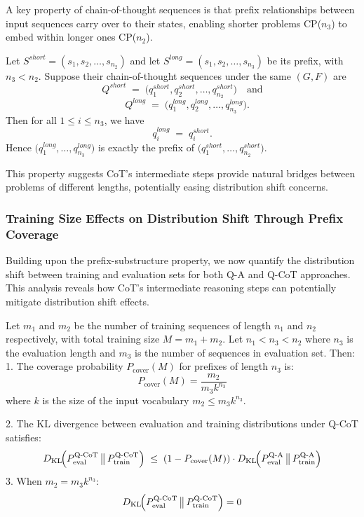 A key property of chain-of-thought sequences is that prefix relationships between input sequences carry over to their states, enabling shorter problems CP($n_3$) to embed within longer ones CP($n_2$).

\begin{lemma}
\label{thm:prefix-substructure}
Let \(S^{short} = (s_1, s_2, \ldots, s_{n_2})\) and let \(S^{long} = (s_1, s_2, \ldots, s_{n_3})\) be its prefix, with \(n_3 < n_2\).  Suppose their chain-of-thought sequences under the same \((G,F)\) are
\[
   Q^{short} \;=\;
   \bigl(q_1^{short}, q_2^{short}, \ldots, q_{n_2}^{short}\bigr)
   \quad\text{and}
\]
\[\quad
   Q^{long} \;=\;
   \bigl(q_1^{long}, q_2^{long}, \ldots, q_{n_3}^{long}\bigr).
\]
Then for all \(1 \le i \le n_3\), we have
\[
   q_i^{long} 
   \;=\; 
   q_i^{short}.
\]
Hence \(\bigl(q_1^{long},\ldots,q_{n_3}^{long}\bigr)\) is exactly the prefix of \(\bigl(q_1^{short},\ldots,q_{n_2}^{short}\bigr)\).
\end{lemma}

This property suggests CoT's intermediate steps provide natural bridges between problems of different lengths, potentially easing distribution shift concerns.
\subsubsection{Training Size Effects on Distribution Shift Through Prefix Coverage}
Building upon the prefix-substructure property, we now quantify the distribution shift between training and evaluation sets for both Q-A and Q-CoT approaches. This analysis reveals how CoT's intermediate reasoning steps can potentially mitigate distribution shift effects.
\begin{theorem}
\label{thm:kl-reduction}
Let $m_1$ and $m_2$ be the number of training sequences of length $n_1$ and $n_2$ respectively, with total training size $M = m_1 + m_2$. Let $n_1 < n_3 < n_2$ where $n_3$ is the evaluation length and $m_3$ is the number of sequences in evaluation set. Then:
1. The coverage probability $P_{\text{cover}}(M)$ for prefixes of length $n_3$ is:
\[
   P_{\text{cover}}(M) = \frac{m_2}{m_3 k^{n_3}}
\]
where $k$ is the size of the input vocabulary $m_2 \leq m_3 k^{n_3}$.

2. The KL divergence between evaluation and training distributions under Q-CoT satisfies:
\[
   D_{\mathrm{KL}}\!\Bigl(
      P_{\text{eval}}^{\text{Q-CoT}}
      \,\big\|\,
      P_{\text{train}}^{\text{Q-CoT}}
   \Bigr)
   \;\leq\;
   (1 - P_{\text{cover}}(M)) \cdot D_{\mathrm{KL}}\!\Bigl(
      P_{\text{eval}}^{\text{Q-A}}
      \,\big\|\,
      P_{\text{train}}^{\text{Q-A}}
   \Bigr)
\]
\vspace{0em}
3. When $m_2 = m_3  k^{n_3}$:
\[
    D_{\mathrm{KL}}\!\Bigl(
      P_{\text{eval}}^{\text{Q-CoT}}
      \,\big\|\,
      P_{\text{train}}^{\text{Q-CoT}}
   \Bigr) = 0
\]
\end{theorem}

